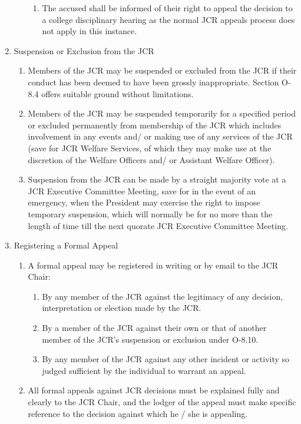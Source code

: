 \begin{enumerate}
\begin{enumerate}
\begin{enumerate}
            \item The accused shall be informed of their right to appeal the decision to a college disciplinary hearing as the normal JCR appeals process does not apply in this instance.
        \end{enumerate}
    \end{enumerate}
    \item Suspension or Exclusion from the JCR
    \begin{enumerate}
        \item Members of the JCR may be suspended or excluded from the JCR if their conduct has been deemed to have been grossly inappropriate. Section O-8.4 offers suitable ground without limitations.
        \item Members of the JCR may be suspended temporarily for a specified period or excluded permanently from membership of the JCR which includes involvement in any events and/ or making use of any services of the JCR (save for JCR Welfare Services, of which they may make use at the discretion of the Welfare Officers and/ or Assistant Welfare Officer).
        \item Suspension from the JCR can be made by a straight majority vote at a JCR Executive Committee Meeting, save for in the event of an emergency, when the President may exercise the right to impose temporary suspension, which will normally be for no more than the length of time till the next quorate JCR Executive Committee Meeting.
    \end{enumerate}
    \item Registering a Formal Appeal
    \begin{enumerate}
        \item A formal appeal may be registered in writing or by email to the JCR Chair:
        \begin{enumerate}
            \item By any member of the JCR against the legitimacy of any decision, interpretation or
            election made by the JCR.
            \item By a member of the JCR against their own or that of another member of the JCR’s suspension or exclusion under O-8.10.
            \item By any member of the JCR against any other incident or activity so judged sufficient by the individual to warrant an appeal.
        \end{enumerate}
        \item All formal appeals against JCR decisions must be explained fully and clearly to the JCR Chair, and the lodger of the appeal must make specific reference to the decision against which he / she is appealing.

\end{enumerate}
\end{enumerate}
